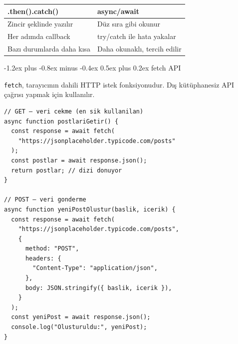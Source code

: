 \documentclass[12pt, a4paper]{article}
\makeatletter
\renewcommand{\subsection}{%
  \@startsection{subsection}{2}{\z@}%
    {-1.2ex plus -0.8ex minus -0.4ex}%
    {0.5ex plus 0.2ex}%
    {\normalfont\large\bfseries\sffamily\color{secondary}}%
}
\makeatother
\begin{document}
\vspace{6pt}

\begin{tcolorbox}[enhanced, colback=lightbg, colframe=gray!30, arc=4pt]
\sffamily\small
\begin{tabularx}{\textwidth}{X X}
\toprule
\bfseries .then().catch() & \bfseries async/await \\
\midrule
Zincir şeklinde yazılır & Düz sıra gibi okunur \\
Her adımda callback & try/catch ile hata yakalar \\
Bazı durumlarda daha kısa & Daha okunaklı, tercih edilir \\
\bottomrule
\end{tabularx}
\end{tcolorbox}

\vspace{6pt}

\subsection{fetch API}

\texttt{fetch}, tarayıcının dahili HTTP istek fonksiyonudur.
Dış kütüphanesiz API çağrısı yapmak için kullanılır.

\vspace{6pt}

\begin{tcolorbox}[enhanced, colback=codebg, colframe=gray!30,
    colbacktitle=primary!85!black, coltitle=white, arc=4pt,
    title={\sffamily\bfseries\small fetch ile GET ve POST}]
\begin{lstlisting}[style=jsstyle]
// GET — veri cekme (en sik kullanilan)
async function postlariGetir() {
  const response = await fetch(
    "https://jsonplaceholder.typicode.com/posts"
  );
  const postlar = await response.json();
  return postlar; // dizi donuyor
}

// POST — veri gonderme
async function yeniPostOlustur(baslik, icerik) {
  const response = await fetch(
    "https://jsonplaceholder.typicode.com/posts",
    {
      method: "POST",
      headers: {
        "Content-Type": "application/json",
      },
      body: JSON.stringify({ baslik, icerik }),
    }
  );
  const yeniPost = await response.json();
  console.log("Olusturuldu:", yeniPost);
}
\end{lstlisting}
\end{tcolorbox}
\end{document}
